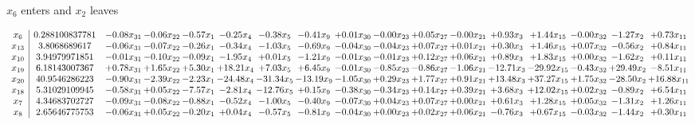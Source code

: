 \documentclass[9pt]{article}
\begin{document}
 $ x_{6} $ enters and $ x_{2} $ leaves 

 \[\begin{array}{c| c c@{\hskip 2pt} c@{\hskip 2pt} c@{\hskip 2pt} c@{\hskip 2pt} c@{\hskip 2pt} c@{\hskip 2pt} c@{\hskip 2pt} c@{\hskip 2pt} c@{\hskip 2pt} c@{\hskip 2pt} c@{\hskip 2pt} c@{\hskip 2pt} c@{\hskip 2pt} c@{\hskip 2pt} c@{\hskip 2pt} }
 x_{6}   &  0.288100837781 & -0.08 x_{31} & -0.06 x_{22} & -0.57 x_{1} & -0.25 x_{4} & -0.38 x_{5} & -0.41 x_{9} & +  0.01 x_{30} & -0.00 x_{23} & +  0.05 x_{27} & -0.00 x_{21} & +  0.93 x_{3} & +  1.44 x_{15} & -0.00 x_{32} & -1.27 x_{2} & +  0.73 x_{11}\\
 x_{13}   &  3.8068689617 & -0.06 x_{31} & -0.07 x_{22} & -0.26 x_{1} & -0.34 x_{4} & -1.03 x_{5} & -0.69 x_{9} & -0.04 x_{30} & -0.04 x_{23} & +  0.07 x_{27} & +  0.01 x_{21} & +  0.30 x_{3} & +  1.46 x_{15} & +  0.07 x_{32} & -0.56 x_{2} & +  0.84 x_{11}\\
 x_{10}   &  3.94979971851 & -0.01 x_{31} & -0.10 x_{22} & -0.09 x_{1} & -1.95 x_{4} & +  0.01 x_{5} & -1.21 x_{9} & -0.01 x_{30} & -0.01 x_{23} & +  0.12 x_{27} & +  0.06 x_{21} & +  0.89 x_{3} & +  1.83 x_{15} & +  0.00 x_{32} & -1.62 x_{2} & +  0.11 x_{11}\\
 x_{19}   &  6.18143007367 & +  0.78 x_{31} & +  1.65 x_{22} & +  5.30 x_{1} & + 18.21 x_{4} & +  7.03 x_{5} & +  6.45 x_{9} & -0.01 x_{30} & -0.85 x_{23} & -0.86 x_{27} & -1.06 x_{21} & -12.71 x_{3} & -29.92 x_{15} & -0.43 x_{32} & + 29.49 x_{2} & -8.51 x_{11}\\
 x_{20}   &  40.9546286223 & -0.90 x_{31} & -2.39 x_{22} & -2.23 x_{1} & -24.48 x_{4} & -31.34 x_{5} & -13.19 x_{9} & -1.05 x_{30} & +  0.29 x_{23} & +  1.77 x_{27} & +  0.91 x_{21} & + 13.48 x_{3} & + 37.27 x_{15} & +  1.75 x_{32} & -28.50 x_{2} & + 16.88 x_{11}\\
 x_{18}   &  5.31029109945 & -0.58 x_{31} & +  0.05 x_{22} & -7.57 x_{1} & -2.81 x_{4} & -12.76 x_{5} & +  0.15 x_{9} & -0.38 x_{30} & -0.34 x_{23} & +  0.14 x_{27} & +  0.39 x_{21} & +  3.68 x_{3} & + 12.02 x_{15} & +  0.02 x_{32} & -0.89 x_{2} & +  6.54 x_{11}\\
 x_{7}   &  4.34683702727 & -0.09 x_{31} & -0.08 x_{22} & -0.88 x_{1} & -0.52 x_{4} & -1.00 x_{5} & -0.40 x_{9} & -0.07 x_{30} & +  0.04 x_{23} & +  0.07 x_{27} & +  0.00 x_{21} & +  0.61 x_{3} & +  1.28 x_{15} & +  0.05 x_{32} & -1.31 x_{2} & +  1.26 x_{11}\\
 x_{8}   &  2.65646775753 & -0.06 x_{31} & +  0.05 x_{22} & -0.20 x_{1} & +  0.04 x_{4} & -0.57 x_{5} & -0.81 x_{9} & -0.04 x_{30} & +  0.00 x_{23} & +  0.02 x_{27} & +  0.06 x_{21} & -0.76 x_{3} & +  0.67 x_{15} & -0.03 x_{32} & -1.44 x_{2} & +  0.30 x_{11}\\

\end{array}\]
\end{document}
